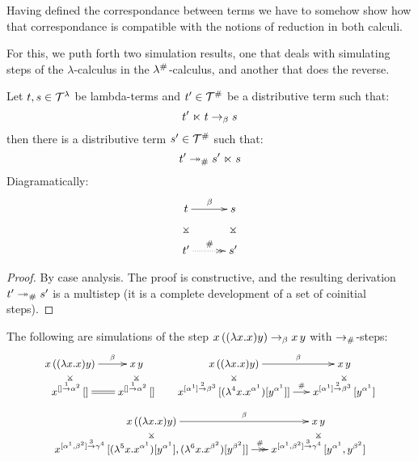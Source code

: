Having defined the correspondance between terms we
have to somehow show how that correspondance is compatible with the notions
of reduction in both calculi.

For this, we puth forth two simulation results, one that deals with simulating steps
of the $\lambda$-calculus in the $\lambda^{\mathtt{\#}}$-calculus, and another that does the
reverse.

\begin{proposition}[Simulation]
Let $t,s \in \mathcal{T}^{\lambda}$ be lambda-terms and $t' \in \mathcal{T}^{\mathtt{\#}}$ be a distributive term such that:
\[
  t' \mathrel{\ltimes} t \mathrel{\to_\beta} s
\]
then there is a distributive term $s' \in \mathcal{T}^{\mathtt{\#}}$ such that:
\[
  t' \mathrel{\twoheadrightarrow_{\mathtt{\#}}} s' \mathrel{\ltimes} s
\]
Diagramatically:
\[
\xymatrix@C=1cm{
 \tm \ar@{}[d]|*=0[@]{\rtimes} \ar[r]^{\beta} & \tmtwo \ar@{}[d]|*=0[@]{\rtimes} \\
 \tm' \ar@{.>>}[r]^{\dist} & \tmtwo' \\
}
\]
\end{proposition}
\begin{proof}
 By case analysis.
The proof is constructive, and the resulting derivation $t' \mathrel{\twoheadrightarrow_{\mathtt{\#}}} s'$ is
a multistep (it is a complete development of a set of coinitial steps).
\end{proof}

\begin{example}
The following are simulations of the step $x\,((\lambda x. x)y) \mathrel{\to_\beta} x\,y$
with $\mathrel{\to_{\mathtt{\#}}}$-steps:
\[
  {\small
    \xymatrix@R=.25cm@C=.5cm{
      \var\,((\lam{\var}{\var})\vartwo)
      \ar[r]^-{\beta}
      \ar@{}[d]|*=0[@]{\rtimes}
      &
      \var\,\vartwo
      \ar@{}[d]|*=0[@]{\rtimes}
    \\
      \var^{[] \tolab{1} \alpha^2}\,[]
      \ar@{=}[r]
      &
      \var^{[] \tolab{1} \alpha^2}\,[]
    }
    \HS
    \xymatrix@R=.25cm@C=.5cm{
      \var\,((\lam{\var}{\var})\vartwo)
      \ar[r]^-{\beta}
      \ar@{}[d]|*=0[@]{\rtimes}
      &
      \var\,\vartwo
      \ar@{}[d]|*=0[@]{\rtimes}
    \\
      \var^{[\alpha^1] \tolab{2} \beta^3}\,[(\lamp{4}{\var}{\var^{\alpha^1}})[\vartwo^{\alpha^1}]]
      \ar[r]^-{\dist}
      &
      \var^{[\alpha^1] \tolab{2} \beta^3}\,[\vartwo^{\alpha^1}]
    }
  }
\]
\[
  {\small
    \xymatrix@R=.25cm@C=.5cm{
      \var\,((\lam{\var}{\var})\vartwo)
      \ar[r]^-{\beta}
      \ar@{}[d]|*=0[@]{\rtimes}
      &
      \var\,\vartwo
      \ar@{}[d]|*=0[@]{\rtimes}
    \\
      \var^{[\alpha^1,\beta^2] \tolab{3} \gamma^4}\,[
        (\lamp{5}{\var}{\var^{\alpha^1}})[\vartwo^{\alpha^1}],
        (\lamp{6}{\var}{\var^{\beta^2}})[\vartwo^{\beta^2}]
      ]
      \ar@{->>}[r]^-{\dist}
      &
      \var^{[\alpha^1,\beta^2] \tolab{3} \gamma^4}\,[
        \vartwo^{\alpha^1},
        \vartwo^{\beta^2}
      ]
    }
  }
\]
\end{example}

